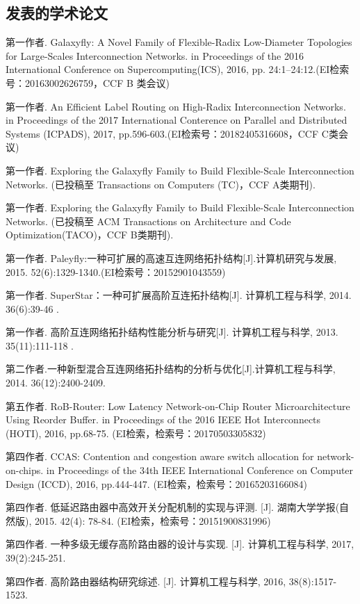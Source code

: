 \begin{resume}

  \section*{发表的学术论文} %

  \begin{enumerate}[{[}1{]}]
  \addtolength{\itemsep}{-.36\baselineskip}%
  \item 第一作者. Galaxyfly: A Novel Family of Flexible-Radix Low-Diameter Topologies for Large-Scales Interconnection Networks. in Proceedings of the 2016 International Conference on Supercomputing(ICS), 2016, pp. 24:1–24:12.(EI检索号：20163002626759，CCF B 类会议)
  \item 第一作者. An Efficient Label Routing on High-Radix Interconnection Networks. in Proceedings of the 2017 International Conterence on Parallel and Distributed Systems (ICPADS), 2017, pp.596-603.(EI检索号：20182405316608，CCF C类会议)
   \item 第一作者. Exploring the Galaxyfly Family to Build Flexible-Scale Interconnection Networks. (已投稿至 Transactions on Computers (TC)，CCF A类期刊).
   \item 第一作者. Exploring the Galaxyfly Family to Build Flexible-Scale Interconnection Networks. (已投稿至 ACM Transactions on Architecture and Code Optimization(TACO)，CCF B类期刊).
  \item 第一作者. Paleyfly:一种可扩展的高速互连网络拓扑结构[J].计算机研究与发展, 2015. 52(6):1329-1340.(EI检索号：20152901043559)
  \item 第一作者. SuperStar：一种可扩展高阶互连拓扑结构[J]. 计算机工程与科学, 2014. 36(6):39-46 .
  \item 第一作者. 高阶互连网络拓扑结构性能分析与研究[J]. 计算机工程与科学, 2013. 35(11):111-118 .
  \item 第二作者.一种新型混合互连网络拓扑结构的分析与优化[J].计算机工程与科学, 2014. 36(12):2400-2409.
  \item 第五作者. RoB-Router: Low Latency Network-on-Chip Router Microarchitecture Using Reorder Buffer. in Proceedings of the 2016 IEEE Hot Interconnects (HOTI), 2016, pp.68-75. (EI检索，检索号：20170503305832)
  \item	第四作者. CCAS: Contention and congestion aware switch allocation for network-on-chips. in Proceedings of the 34th IEEE International Conference on Computer Design (ICCD), 2016, pp.444-447. (EI检索，检索号：20165203166084)
  \item 第四作者. 低延迟路由器中高效开关分配机制的实现与评测. [J]. 湖南大学学报(自然版), 2015. 42(4): 78-84. (EI检索，检索号：20151900831996)
  \item 第四作者. 一种多级无缓存高阶路由器的设计与实现. [J]. 计算机工程与科学, 2017, 39(2):245-251.
  \item 第四作者. 高阶路由器结构研究综述. [J]. 计算机工程与科学, 2016, 38(8):1517-1523.
  \end{enumerate}


\end{resume}

